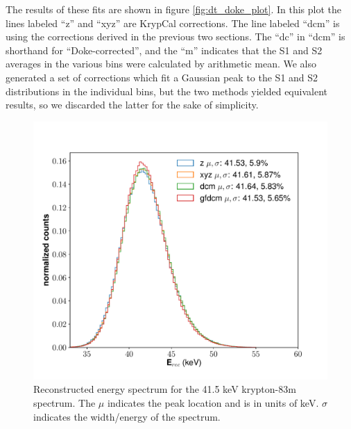 The results of these fits are shown in figure \ref{fig:dt_doke_plot}. In this plot the lines labeled ``z'' and ``xyz'' are KrypCal corrections. The line labeled ``dcm'' is using the corrections derived in the previous two sections. The ``dc'' in ``dcm'' is shorthand for ``Doke-corrected'', and the ``m'' indicates that the S1 and S2 averages in the various bins were calculated by arithmetic mean. We also generated a set of corrections which fit a Gaussian peak to the S1 and S2 distributions in the individual bins, but the two methods yielded equivalent results, so we discarded the latter for the sake of simplicity.  
\begin{figure}[h!]
  \centering
  \includegraphics[width=\textwidth]{Figures/E_spec_Kr.pdf}
  \caption{Reconstructed energy spectrum for the 41.5 keV krypton-83m spectrum. The $\mu$ indicates the peak location and is in units of keV. $\sigma$ indicates the width/energy of the spectrum.}
\label{fig:E_spec_Kr} 
\end{figure}

